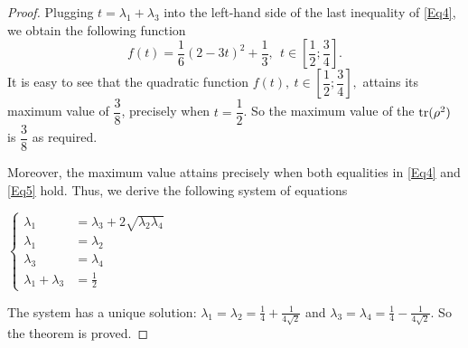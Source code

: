 \documentclass[reqno, 12pt,a4letter]{amsart}
\theoremstyle{definition}
\theoremstyle{plain}
\begin{document}
\begin{proof}
	Plugging $t = \lambda_1 + \lambda_3$ into the left-hand side of the last inequality of \eqref{Eq4},  we obtain the following function $$f(t) = \frac{1}{6}(2-3t)^2 + \frac{1}{3},\ \ t \in \left[\dfrac{1}{2};\dfrac{3}{4}\right].$$
	It is easy to see that the quadratic function $f(t),\ t \in \left[\dfrac{1}{2};\dfrac{3}{4}\right],$ attains its maximum value  of $\dfrac{3}{8}$, precisely when $t = \dfrac{1}{2}$. So the maximum value of the ${\rm tr}(\rho^2)$ is $\dfrac{3}{8}$ as required.
	
	Moreover, the maximum value attains precisely when both equalities in \eqref{Eq4} and \eqref{Eq5} hold. Thus, we derive the following system of equations  
	\begin{center}
		$\begin{cases}
			\lambda_1 &= \lambda_3+ 2 \sqrt{\lambda_2\lambda_4}\\
			\lambda_1 &= \lambda_2\\
			\lambda_3 &=\lambda_4\\
			\lambda_1 + \lambda_3 &= \frac{1}{2}
		\end{cases}$  
	\end{center}  
	The system has a unique solution:    
	$\lambda_1 = \lambda_2 = \frac{1}{4} + \frac{1}{4\sqrt{2}}$ and $\lambda_3 = \lambda_4 = \frac{1}{4} - \frac{1}{4\sqrt{2}}.$ So the theorem is proved.
	
\end{proof}
\end{document}

